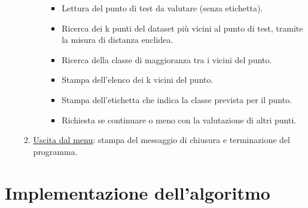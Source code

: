 \documentclass[11pt]{article}
\theoremstyle{definition}
\begin{document}
\begin{itemize}
\begin{enumerate}
\begin{itemize}
         \begin{itemize}
         	 \item Lettura del punto di test da valutare (senza etichetta).
        	 \item Ricerca dei k punti del dataset più vicini al punto di test, tramite la misura di distanza euclidea.
         	\item Ricerca della classe di maggioranza tra i vicini del punto.
         	\item Stampa dell'elenco dei k vicini del punto.
         	\item Stampa dell'etichetta che indica la classe prevista per il punto.
         	\item Richiesta se continuare o meno con la valutazione di altri punti.
         \end{itemize}
       \end{itemize}
      \item \underline{Uscita dal menu}: stampa del messaggio di chiusura e terminazione del programma.
\end{enumerate}
\end{itemize}

\newpage

\section{Implementazione dell'algoritmo}
\end{document}
